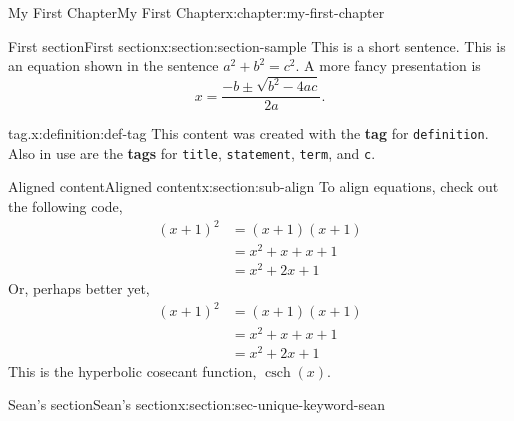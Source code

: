 \documentclass[oneside,10pt,]{book}
\newcommand{\mono}[1]{\texttt{#1}}
\newcommand{\terminology}[1]{\textbf{#1}}
\numberwithin{equation}{section}
\DeclareMathOperator{\csch}{csch}
\begin{document}
%
%
\typeout{************************************************}
\typeout{************************************************}
%
\begin{chapterptx}{My First Chapter}{}{My First Chapter}{}{}{x:chapter:my-first-chapter}
%
%
\typeout{************************************************}
\typeout{************************************************}
%
\begin{sectionptx}{First section}{}{First section}{}{}{x:section:section-sample}
This is a short sentence. This is an equation shown in the sentence \(a^2 + b^2 = c^2\). A more fancy presentation is%
\begin{equation*}
x =
\dfrac{-b \pm \sqrt{b^2-4ac}}{2a}.
\end{equation*}
%
\begin{definition}{tag.}{x:definition:def-tag}%
This content was created with the \terminology{tag} for \mono{definition}.  Also in use are the \terminology{tags} for \mono{title}, \mono{statement}, \mono{term}, and \mono{c}.\end{definition}
%
%
\typeout{************************************************}
\typeout{************************************************}
%
\begin{sectionptx}{Aligned content}{}{Aligned content}{}{}{x:section:sub-align}
To align equations, check out the following code,%
\begin{equation*}
\begin{aligned}
(x+1)^2 &= (x+1)(x+1)\\
&= x^2+x+x+1\\
&= x^2 + 2x +1
\end{aligned}
\end{equation*}
Or, perhaps better yet,%
\begin{align*}
(x+1)^2 &= (x+1)(x+1)\\
&= x^2+x+x+1\\
&= x^2 + 2x +1
\end{align*}
This is the hyperbolic cosecant function, \(\csch(x)\). %
\end{sectionptx}
\end{sectionptx}
%
%
\typeout{************************************************}
\typeout{************************************************}
%
\begin{sectionptx}{Sean's section}{}{Sean's section}{}{}{x:section:sec-unique-keyword-sean}
%
%
\typeout{************************************************}

\end{sectionptx}
\end{chapterptx}
\end{document}
